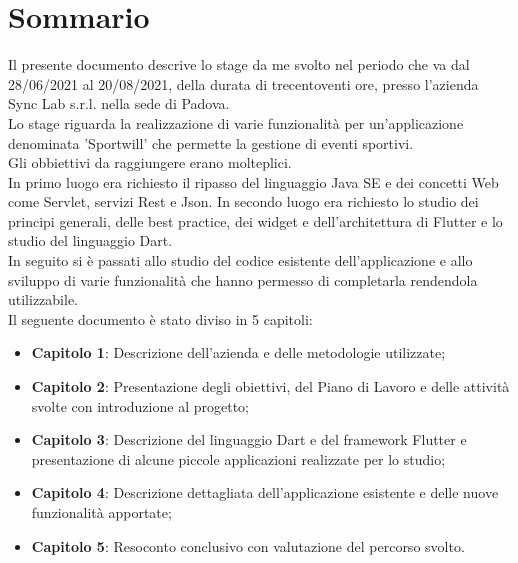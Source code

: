 
\cleardoublepage
{}
{}
\begingroup
\let\clearpage\relax
\let\cleardoublepage\relax
\let\cleardoublepage\relax

\chapter*{Sommario}

Il presente documento descrive lo stage da me svolto nel periodo che va dal 28/06/2021 al 20/08/2021, della durata di trecentoventi ore, presso l'azienda Sync Lab s.r.l. nella sede di Padova.\\
Lo stage riguarda la realizzazione di varie funzionalità per un'applicazione denominata 'Sportwill' che permette la gestione di eventi sportivi.\\
Gli obbiettivi da raggiungere erano molteplici.\\
In primo luogo era richiesto il ripasso del linguaggio Java SE e dei concetti Web come Servlet, servizi Rest e Json.
In secondo luogo era richiesto lo studio dei principi generali, delle best practice, dei widget e dell'architettura di Flutter e lo studio del linguaggio Dart.\\
In seguito si è passati allo studio del codice esistente dell'applicazione e allo sviluppo di varie funzionalità che hanno permesso di completarla rendendola utilizzabile.\\
Il seguente documento è stato diviso in 5 capitoli:
\begin{itemize}
	\item \textbf{Capitolo 1}: Descrizione dell'azienda e delle metodologie utilizzate; \\
	\item \textbf{Capitolo 2}: Presentazione degli obiettivi, del Piano di Lavoro e delle attività svolte con introduzione al progetto; \\
	\item \textbf{Capitolo 3}: Descrizione del linguaggio Dart e del framework Flutter e presentazione di alcune piccole applicazioni realizzate per lo studio; \\
	\item \textbf{Capitolo 4}: Descrizione dettagliata dell'applicazione esistente e delle nuove funzionalità apportate; \\
	\item \textbf{Capitolo 5}: Resoconto conclusivo con valutazione del percorso svolto. \\
\end{itemize}

%
%

\endgroup			

\vfill

